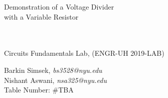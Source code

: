 \documentclass[journal]{IEEEtran}
\begin{document}
\begin{titlepage}
    {\centering
        \vspace*{20em}
        {
        \huge 
        \begin{spacing}{1.5}
            Demonstration of a Voltage Divider \\
            with a Variable Resistor
            
            \\
            \\
            \bigskip
            \large
            Circuits Fundamentals Lab, (ENGR-UH 2019-LAB)
        \end{spacing}

        }
        
    }
    \vfill
    
    {
    \large
    
    \begin{spacing}{1.5}
    \noindent Barkin Simsek, {\it {bs3528@nyu.edu}} 
    \\
    Nishant Aswani, {\it {nsa325@nyu.edu}}
    \\
    Table Number: \#TBA%
    \end{spacing}
    }


\end{titlepage}
\clearpage\mbox{}
\clearpage
{}
\setcounter{page}{1}




%
{}


\begin{abstract}
In this experiment a voltage divider was built using 1K\ohm, 5K\ohm, and 1K\ohm  potentiometer. Different combinations of the resistors were tested on the breadboard and results were recorded.
\end{abstract}
\end{document}
